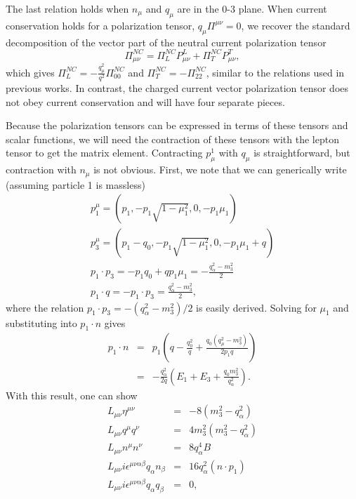 \documentclass[12pt,letter]{article}
\begin{document}
The last relation holds when $n_\mu$ and $q_\mu$ are in the 0-3 plane. 
When current conservation holds for a polarization tensor, $q_\mu \Pi^{\mu \nu}
= 0$, we recover the standard decomposition of the vector part of the 
neutral current polarization tensor
\begin{equation}
\Pi_{\mu\nu}^{NC} = \Pi_L^{NC} P^L_{\mu \nu} + \Pi_T^{NC} P^T_{\mu \nu},
\end{equation}
which gives $\Pi^{NC}_L = -\frac{q_\mu^2}{q^2} \Pi^{NC}_{00}$ and $\Pi^{NC}_T =
-\Pi^{NC}_{22}$, similar to the relations used in previous works. In contrast, 
the charged current vector polarization tensor does not obey current conservation
and will have four separate pieces.  

Because the polarization tensors can be expressed in terms of these tensors and 
scalar functions, we will need the contraction of these tensors with the lepton 
tensor to get the matrix element. Contracting $p^1_\mu$ with $q_\mu$ is 
straightforward, but contraction with $n_\mu$ is not obvious. First, we note that
we can generically write (assuming particle 1 is massless) 
\begin{eqnarray}
p_1^\mu = (p_1, -p_1 \sqrt{1-\mu_1^2}, 0, - p_1 \mu_1) \\
p_3^\mu = (p_1 - q_0, -p_1 \sqrt{1-\mu_1^2}, 0, - p_1 \mu_1 + q) \\
p_1 \cdot p_3 = -p_1 q_0  + q p_1 \mu_1 = -\frac{q_\alpha^2-m_3^2}{2} \\
p_1 \cdot q = -p_1\cdot p_3 = \frac{q_\alpha^2-m_3^2}{2},  
\end{eqnarray}
where the relation $p_1 \cdot p_3 = - (q_\alpha^2-m_3^2)/2$ is easily derived. 
Solving for $\mu_1$ and substituting into $p_1 \cdot n$ gives
\begin{eqnarray}
p_1 \cdot n &=& p_1 \left(q - \frac{q_0^2}{q} 
+ \frac{q_0 (q_\mu^2 - m_3^2)}{2 p_1 q} \right) \\
&=& - \frac{q_\alpha^2}{2 q}\left(E_1 + E_3 + \frac{q_0m_3^2}{q_\alpha^2} \right).
\end{eqnarray}  
With this result, one can show 
\begin{eqnarray}
L_{\mu \nu} \eta^{\mu \nu} &=&-8 (m_3^2 - q_\alpha^2 ) \\
L_{\mu \nu} q^\mu q^\nu &=& 4 m_3^2 \left(m_3^2 - q_\alpha^2 \right) \\
L_{\mu \nu} n^\mu n^\nu &=& 8 q_\alpha^4 B \\
L_{\mu \nu} i \epsilon^{\mu \nu \alpha \beta} q_\alpha n_\beta &=& 
16 q_\alpha^2 (n \cdot p_1) \\
L_{\mu \nu} i \epsilon^{\mu \nu \alpha \beta} q_\alpha q_\beta &=& 
0,
\end{eqnarray}
\end{document}
